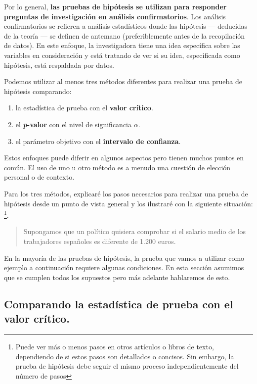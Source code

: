 \documentclass[
]{book}
\providecommand{\tightlist}{%
  \setlength{\itemsep}{0pt}\setlength{\parskip}{0pt}}
\begin{document}
Por lo general, \textbf{las pruebas de hipótesis se utilizan para responder preguntas de investigación en análisis confirmatorios}. Los análisis confirmatorios se refieren a análisis estadísticos donde las hipótesis --- deducidas de la teoría --- se definen de antemano (preferiblemente antes de la recopilación de datos). En este enfoque, la investigadora tiene una idea específica sobre las variables en consideración y está tratando de ver si su idea, especificada como hipótesis, está respaldada por datos.

Podemos utilizar al menos tres métodos diferentes para realizar una prueba de hipótesis comparando:

\begin{enumerate}
\def\labelenumi{\arabic{enumi}.}
\tightlist
\item
  la estadística de prueba con el \textbf{valor crítico}.
\item
  el \textbf{\emph{p}-valor} con el nivel de significancia \(\alpha\).
\item
  el parámetro objetivo con el \textbf{intervalo de confianza}.
\end{enumerate}

Estos enfoques puede diferir en algunos aspectos pero tienen muchos puntos en común. El uso de uno u otro método es a menudo una cuestión de elección personal o de contexto.

Para los tres métodos, explicaré los pasos necesarios para realizar una prueba de hipótesis desde un punto de vista general y los ilustraré con la siguiente situación: \footnote{Puede ver más o menos pasos en otros artículos o libros de texto, dependiendo de si estos pasos son detallados o concisos. Sin embargo, la prueba de hipótesis debe seguir el mismo proceso independientemente del número de pasos}.

\begin{quote}
Supongamos que un político quisiera comprobar si el salario medio de los trabajadores españoles es diferente de 1.200 euros.
\end{quote}

En la mayoría de las pruebas de hipótesis, la prueba que vamos a utilizar como ejemplo a continuación requiere algunas condiciones. En esta sección asumimos que se cumplen todos los supuestos pero más adelante hablaremos de esto.

\hypertarget{comparando-la-estaduxedstica-de-prueba-con-el-valor-cruxedtico.}{%
\subsection{\texorpdfstring{Comparando la estadística de prueba con el \textbf{valor crítico}.}{Comparando la estadística de prueba con el valor crítico.}}\label{comparando-la-estaduxedstica-de-prueba-con-el-valor-cruxedtico.}}
\end{document}
